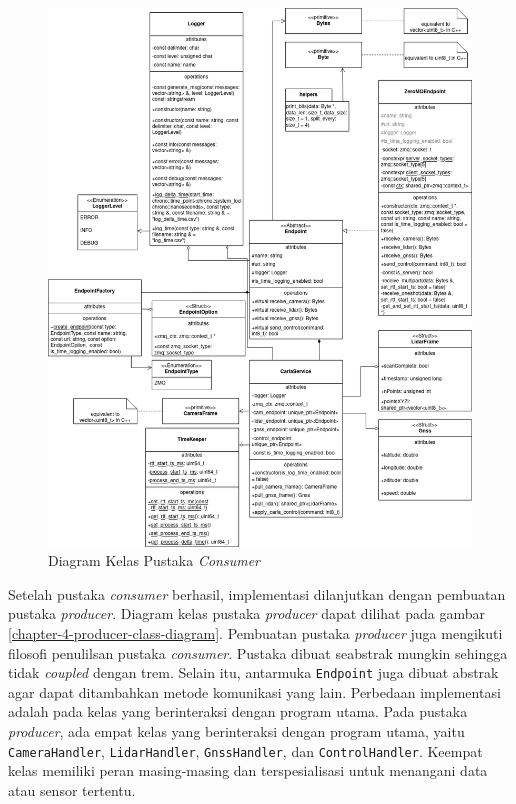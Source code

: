 \begin{figure}[h!]
	\centering
	\includegraphics[width=1.0\textwidth]{resources/chapter-4/consumer-class_diagram.png}
	\caption{Diagram Kelas Pustaka \textit{Consumer}}
	\label{chapter-4-consumer-class-diagram}
\end{figure}

Setelah pustaka \textit{consumer} berhasil, implementasi dilanjutkan dengan
pembuatan pustaka \textit{producer}. Diagram kelas pustaka \textit{producer}
dapat dilihat pada gambar \ref{chapter-4-producer-class-diagram}. Pembuatan
pustaka \textit{producer} juga mengikuti filosofi penulilsan pustaka
\textit{consumer}. Pustaka dibuat seabstrak mungkin sehingga tidak
\textit{coupled} dengan trem. Selain itu, antarmuka \texttt{Endpoint} juga
dibuat abstrak agar dapat ditambahkan metode komunikasi yang lain. Perbedaan
implementasi adalah pada kelas yang berinteraksi dengan program utama. Pada
pustaka \textit{producer}, ada empat kelas yang berinteraksi dengan program
utama, yaitu \texttt{CameraHandler}, \texttt{LidarHandler},
\texttt{GnssHandler}, dan \texttt{ControlHandler}. Keempat kelas memiliki peran
masing-masing dan terspesialisasi untuk menangani data atau sensor tertentu.

